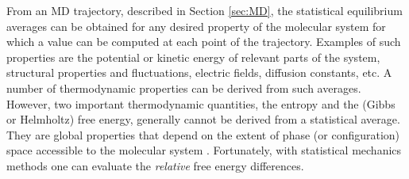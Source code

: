 From an MD trajectory, described in Section \ref{sec:MD}, the statistical equilibrium averages can be obtained for any desired property of the molecular system for which a value can be computed at each point of the trajectory. Examples of such properties are the potential or kinetic energy of relevant parts of the system, structural properties and fluctuations, electric fields, diffusion constants, etc. A number of thermodynamic properties can be derived from such averages. However, two important thermodynamic quantities, the entropy and the (Gibbs or Helmholtz) free energy, generally cannot be derived from a statistical average. They are global properties that depend on the extent of phase (or configuration) space accessible to the molecular system \cite{van1988role}. Fortunately, with statistical mechanics methods one can evaluate the \textit{relative} free energy differences.



